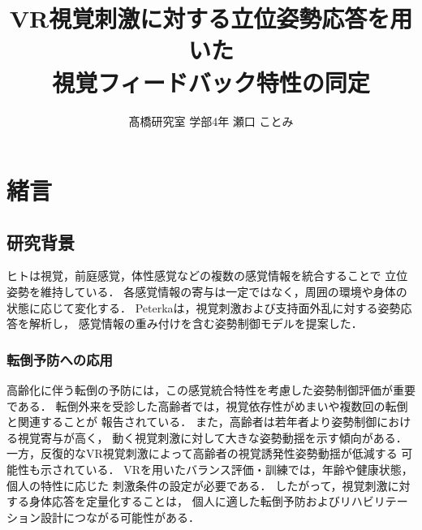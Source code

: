 \documentclass[a4paper,9pt,twocolumn]{ltjsarticle}
\title{VR視覚刺激に対する立位姿勢応答を用いた\\視覚フィードバック特性の同定}
\author{髙橋研究室 学部4年 瀬口 ことみ}
\affiliation{Keio University, 3-14-1 Hiyoshi, Kohoku-ku, Yokohama}
\begin{document}

\section{緒言}

\subsection{研究背景}

ヒトは視覚，前庭感覚，体性感覚などの複数の感覚情報を統合することで
立位姿勢を維持している．
各感覚情報の寄与は一定ではなく，周囲の環境や身体の状態に応じて変化する．
Peterkaは，視覚刺激および支持面外乱に対する姿勢応答を解析し，
感覚情報の重み付けを含む姿勢制御モデルを提案した\cite{peterka2002}．

\subsubsection{転倒予防への応用}

高齢化に伴う転倒の予防には，この感覚統合特性を考慮した姿勢制御評価が重要である．
転倒外来を受診した高齢者では，視覚依存性がめまいや複数回の転倒と関連することが
報告されている\cite{barr2016}．
また，高齢者は若年者より姿勢制御における視覚寄与が高く\cite{neumann2025}，
動く視覚刺激に対して大きな姿勢動揺を示す傾向がある\cite{phu2023}．
一方，反復的なVR視覚刺激によって高齢者の視覚誘発性姿勢動揺が低減する
可能性も示されている\cite{barbanchon2026}．
VRを用いたバランス評価・訓練では，年齢や健康状態，個人の特性に応じた
刺激条件の設定が必要である\cite{soltani2021}．
したがって，視覚刺激に対する身体応答を定量化することは，
個人に適した転倒予防およびリハビリテーション設計につながる可能性がある．
\end{document}
